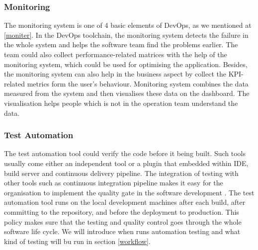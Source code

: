 \subsubsection{Monitoring}
The monitoring system is one of 4 basic elements of DevOps, as we mentioned at \ref{moniter}. In the DevOps toolchain, the monitoring system detects the failure in the whole system and helps the software team find the problems earlier. The team could also collect performance-related matrices with the help of the monitoring system, which could be used for optimising the application. Besides, the monitoring system can also help in the business aspect by collect the KPI-related metrics form the user's behaviour. Monitoring system combines the data measured from the system and then visualises these data on the dashboard. The visualisation helps people which is not in the operation team understand the data.
\subsubsection{Test Automation}
The test automation tool could verify the code before it being built. Such tools usually come either an independent tool or a plugin that embedded within IDE, build server and continuous delivery pipeline. The integration of testing with other tools such as continuous integration pipeline makes it easy for the organisation to implement the quality gate in the software development \cite{huttermann2012devops}.
The test automation tool runs on the local development machines after each build, after committing to the repository, and before the deployment to production. This policy makes sure that the testing and quality control goes through the whole software life cycle. We will introduce when runs automation testing and what kind of testing will bu run in section \ref{workflow}. 
